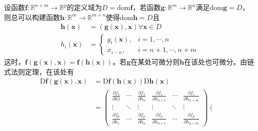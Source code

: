 \documentclass[../main.tex]{subfiles}
\begin{document}
\begin{example}\label{exp:II.4.9}
    设函数$\mathbf{f}:\mathbb{R}^{n+m}\rightarrow\mathbb{R}^p$的定义域为$D=\mathrm{dom}\mathbf{f}$，若函数$\mathbf{g}:\mathbb{R}^m\rightarrow\mathbb{R}^n$满足$\mathrm{dom}\mathbf{g}=D$，则总可以构建函数$\mathbf{h}:\mathbb{R}^m\rightarrow\mathbb{R}^{m+n}$使得$\mathrm{dom}\mathbf{h}=D$且
    \begin{align*}
        \mathbf{h}\left(\mathbf{x}\right) & =\left(\mathbf{g}\left(\mathbf{x}\right),\mathbf{x}\right)\forall\mathbf{x}\in D \\
        h_i\left(\mathbf{x}\right)        & =\left\{\begin{array}{ll}
                                                        g_i\left(\mathbf{x}\right), & i=1,\cdots,n     \\
                                                        x_{i-n},                    & i=n+1,\cdots,n+m
                                                    \end{array}\right.
    \end{align*}
    这时，$\mathbf{f}\left(\mathbf{g}\left(\mathbf{x}\right),\mathbf{x}\right)=\mathbf{f}\left(\mathbf{h}\left(\mathbf{x}\right)\right)$。若$\mathbf{g}$在某处可微分则$\mathbf{h}$在该处也可微分。由链式法则定理，在该处有
    \begin{align*}
        \mathrm{D}\mathbf{f}\left(\mathbf{g}\left(\mathbf{x}\right),\mathbf{x}\right)
         & =\mathrm{D}\mathbf{f}\left(\mathbf{h}\left(\mathbf{x}\right)\right)\mathrm{D}\mathbf{h}\left(\mathbf{x}\right)                                                                                                             \\
         & =\left(\begin{array}{cccccc}
                          \frac{\partial f_1}{\partial h1}  & \cdots & \frac{\partial f_1}{\partial h_n} & \frac{\partial f_1}{\partial h_{n+1}} & \cdots & \frac{\partial f_1}{\partial h_{n+m}} \\
                          \vdots                            & \ddots & \vdots                            & \vdots                                & \ddots & \vdots                                \\
                          \frac{\partial f_p}{\partial h_1} & \cdots & \frac{\partial f_p}{\partial h_n} & \frac{\partial f_p}{\partial h_{n+1}} & \cdots & \frac{\partial f_p}{\partial h_{n+m}}
                      \end{array}\right)\left(\begin{array}{ccc}

\end{array}
\end{align*}
\end{example}
\end{document}
